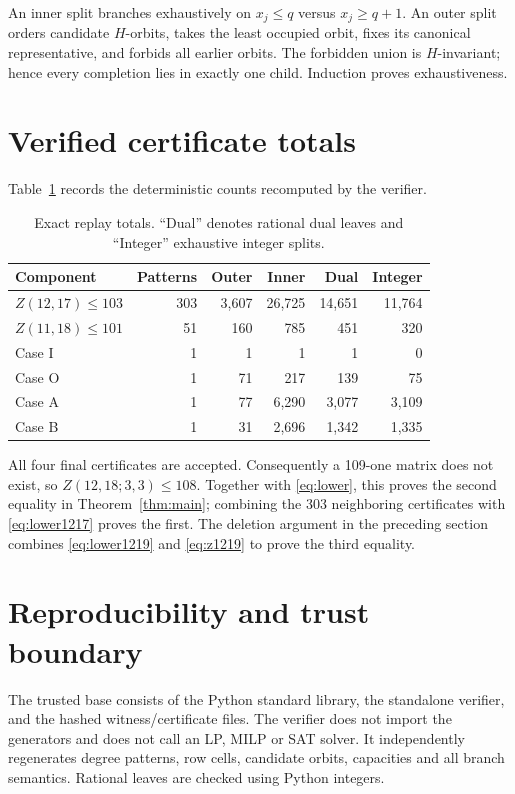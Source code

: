 \documentclass[11pt]{article}
\begin{document}
An inner split branches exhaustively on $x_j\le q$ versus $x_j\ge q+1$. An outer split orders candidate $H$-orbits, takes the least occupied orbit, fixes its canonical representative, and forbids all earlier orbits. The forbidden union is $H$-invariant; hence every completion lies in exactly one child. Induction proves exhaustiveness.

\section{Verified certificate totals}
Table~\ref{tab:stats} records the deterministic counts recomputed by the verifier.
\begin{table}[h]
\centering
\begin{tabular}{lrrrrr}
\toprule
Component & Patterns & Outer & Inner & Dual & Integer\\
\midrule
$Z(12,17)\le103$ & 303 & 3,607 & 26,725 & 14,651 & 11,764\\
$Z(11,18)\le101$ & 51 & 160 & 785 & 451 & 320\\
Case I & 1 & 1 & 1 & 1 & 0\\
Case O & 1 & 71 & 217 & 139 & 75\\
Case A & 1 & 77 & 6,290 & 3,077 & 3,109\\
Case B & 1 & 31 & 2,696 & 1,342 & 1,335\\
\bottomrule
\end{tabular}
\caption{Exact replay totals. ``Dual'' denotes rational dual leaves and ``Integer'' exhaustive integer splits.}
\label{tab:stats}
\end{table}

All four final certificates are accepted. Consequently a 109-one matrix does not exist, so $Z(12,18;3,3)\le108$. Together with \eqref{eq:lower}, this proves the second equality in Theorem~\ref{thm:main}; combining the 303 neighboring certificates with \eqref{eq:lower1217} proves the first.
The deletion argument in the preceding section combines \eqref{eq:lower1219}
and \eqref{eq:z1219} to prove the third equality.

\section{Reproducibility and trust boundary}
The trusted base consists of the Python standard library, the standalone verifier, and the hashed witness/certificate files. The verifier does not import the generators and does not call an LP, MILP or SAT solver. It independently regenerates degree patterns, row cells, candidate orbits, capacities and all branch semantics. Rational leaves are checked using Python integers.
\end{document}
